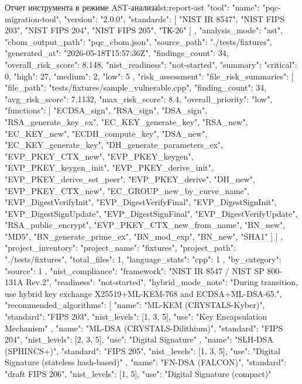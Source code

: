 \documentclass{itmo-vkr}
\begin{document}
\begin{itmolisting}[JSON]{Отчет инструмента в режиме AST-анализа}{lst:report-ast}
	{
		"tool": {
			"name": "pqc-migration-tool",
			"version": "2.0.0",
			"standards": [
			"NIST IR 8547", "NIST FIPS 203", "NIST FIPS 204",
			"NIST FIPS 205", "ТК-26"
			]
		},
		"analysis_mode": "ast",
		"cbom_output_path": "pqc_cbom.json",
		"source_path": "./tests/fixtures",
		"generated_at": "2026-05-18T15:57:36Z",
		"findings_count": 34,
		"overall_risk_score": 8.148,
		"nist_readiness": "not-started",
		"summary": {
			"critical": 0,
			"high": 27,
			"medium": 2,
			"low": 5
		},
		"risk_assessment": {
			"file_risk_summaries": [
			{
				"file_path": "tests/fixtures/sample_vulnerable.cpp",
				"finding_count": 34,
				"avg_risk_score": 7.1132,
				"max_risk_score": 8.4,
				"overall_priority": "low",
				"functions": [
				"ECDSA_sign", "RSA_sign", "DSA_sign", "RSA_generate_key_ex",
				"EC_KEY_generate_key", "RSA_new", "EC_KEY_new",
				"ECDH_compute_key", "DSA_new", "EC_KEY_generate_key",
				"DH_generate_parameters_ex", "EVP_PKEY_CTX_new",
				"EVP_PKEY_keygen", "EVP_PKEY_keygen_init",
				"EVP_PKEY_derive_init", "EVP_PKEY_derive_set_peer",
				"EVP_PKEY_derive", "DH_new", "EVP_PKEY_CTX_new",
				"EC_GROUP_new_by_curve_name", "EVP_DigestVerifyInit",
				"EVP_DigestVerifyFinal", "EVP_DigestSignInit",
				"EVP_DigestSignUpdate", "EVP_DigestSignFinal",
				"EVP_DigestVerifyUpdate", "RSA_public_encrypt",
				"EVP_PKEY_CTX_new_from_name", "BN_new", "MD5",
				"BN_generate_prime_ex", "BN_mod_exp", "BN_new", "SHA1"
				]
			}
			]
		},
		"project_inventory": {
			"project_name": "fixtures",
			"project_path": "./tests/fixtures",
			"total_files": 1,
			"language_stats": { "cpp": 1 },
			"by_category": { "source": 1 }
		},
		"nist_compliance": {
			"framework": "NIST IR 8547 / NIST SP 800-131A Rev.2",
			"readiness": "not-started",
			"hybrid_mode_note": "During transition, use hybrid key exchange X25519+ML-KEM-768 and ECDSA+ML-DSA-65.",
			"recommended_algorithms": [
			{
				"name": "ML-KEM (CRYSTALS-Kyber)",
				"standard": "FIPS 203",
				"nist_levels": [1, 3, 5],
				"use": "Key Encapsulation Mechanism"
			},
			{
				"name": "ML-DSA (CRYSTALS-Dilithium)",
				"standard": "FIPS 204",
				"nist_levels": [2, 3, 5],
				"use": "Digital Signature"
			},
			{
				"name": "SLH-DSA (SPHINCS+)",
				"standard": "FIPS 205",
				"nist_levels": [1, 3, 5],
				"use": "Digital Signature (stateless hash-based)"
			},
			{
				"name": "FN-DSA (FALCON)",
				"standard": "draft FIPS 206",
				"nist_levels": [1, 5],
				"use": "Digital Signature (compact)"
}}}
\end{itmolisting}
\end{document}
